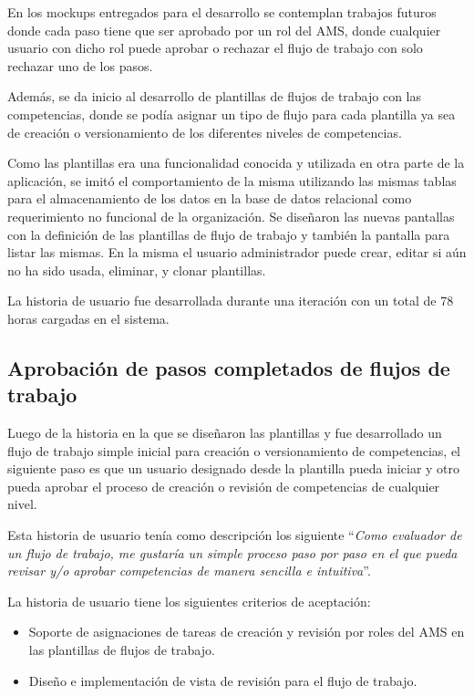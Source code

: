 En los mockups entregados para el desarrollo se contemplan trabajos futuros donde cada paso tiene que ser aprobado por un rol del AMS, donde cualquier usuario con dicho rol puede aprobar o rechazar el flujo de trabajo con solo rechazar uno de los pasos. 

Además, se da inicio al desarrollo de plantillas de flujos de trabajo con las competencias, donde se podía asignar un tipo de flujo para cada plantilla ya sea de creación o versionamiento de los diferentes niveles de competencias.

Como las plantillas era una funcionalidad conocida y utilizada en otra parte de la aplicación, se imitó el comportamiento de la misma utilizando las mismas tablas para el almacenamiento de los datos en la base de datos relacional como requerimiento no funcional de la organización. Se diseñaron las nuevas pantallas con la definición de las plantillas de flujo de trabajo y también la pantalla para listar las mismas. En la misma el usuario administrador puede crear, editar si aún no ha sido usada, eliminar, y clonar plantillas.

La historia de usuario fue desarrollada durante una iteración con un total de 78 horas cargadas en el sistema.

\subsection{Aprobación de pasos completados de flujos de trabajo}

Luego de la historia en la que se diseñaron las plantillas y fue desarrollado un flujo de trabajo simple inicial para creación o versionamiento de competencias, el siguiente paso es que un usuario designado desde la plantilla pueda iniciar y otro pueda aprobar el proceso de creación o revisión de competencias de cualquier nivel.

Esta historia de usuario tenía como descripción los siguiente \enquote{\textit{Como evaluador de un flujo de trabajo, me gustaría un simple proceso paso por paso en el que pueda revisar y/o aprobar competencias de manera sencilla e intuitiva}}.

La historia de usuario tiene los siguientes criterios de aceptación:
\begin{itemize}
	\item Soporte de asignaciones de tareas de creación y revisión por roles del AMS en las plantillas de flujos de trabajo.
	\item Diseño e implementación de vista de revisión para el flujo de trabajo.
\end{itemize}

